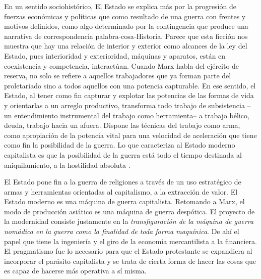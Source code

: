 En un sentido sociohistórico, El Estado se explica más por la progresión de fuerzas económicas y políticas que como resultado de una guerra con frentes y motivos definidos, como algo determinado por la contingencia que produce una narrativa de correspondencia palabra-cosa-Historia. Parece que esta ficción nos muestra que hay una relación de interior y exterior como alcances de la ley del Estado, pues interioridad y exterioridad, máquinas y aparatos, están en coexistencia y competencia, interactúan. Cuando Marx habla del ejército de reserva, no solo se refiere a aquellos trabajadores que ya forman parte del proletariado sino a todos aquellos con una potencia capturable. En ese sentido, el Estado, al tener como fin capturar y explotar las potencias de las formas de vida y orientarlas a un arreglo productivo, transforma todo trabajo de subsistencia --un entendimiento instrumental del trabajo como herramienta-- a trabajo bélico, deuda, trabajo hacia un afuera. Dispone las técnicas del trabajo como arma, como apropiación de la potencia vital para una velocidad de aceleración que tiene como fin la posibilidad de la guerra. Lo que caracteriza al Estado moderno capitalista es que la posibilidad de la guerra está todo el tiempo destinada al aniquilamiento, a la hostilidad absoluta \autocite{tiqqunIntroduccionGuerraCivil2008}.

El Estado pone fin a la guerra de religiones a través de un uso estratégico de armas y herramientas orientadas al capitalismo, a la extracción de valor. El Estado moderno es una máquina de guerra capitalista. Retomando a Marx, el modo de producción asiático es una máquina de guerra despótica. El proyecto de la modernidad consiste justamente en la \emph{transfiguración de la máquina de guerra nomádica en la guerra como la finalidad de toda forma maquínica}. De ahí el papel que tiene la ingeniería y el giro de la economía mercantilista a la financiera. El pragmatismo fue lo necesario para que el Estado protestante se expandiera al incorporar el parásito capitalista y se trata de cierta forma de hacer las cosas que es capaz de hacerse más operativa a sí misma.

